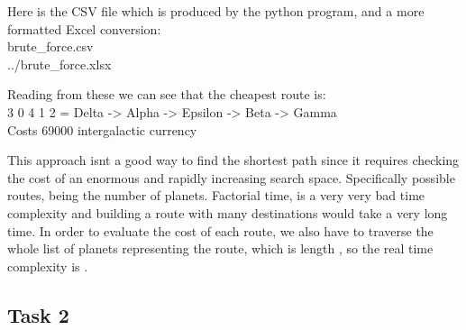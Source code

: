 \documentclass[
]{article}
\begin{document}
Here is the CSV file which is produced by the python program, and a more
formatted Excel conversion:\\
brute\_force.csv\\
../brute\_force.xlsx

Reading from these we can see that the cheapest route is:\\
3 0 4 1 2 = Delta -\textgreater{} Alpha -\textgreater{} Epsilon
-\textgreater{} Beta -\textgreater{} Gamma\\
Costs 69000 intergalactic currency

This approach isn\textquotesingle t a good way to find the shortest path
since it requires checking the cost of an enormous and rapidly
increasing search space. Specifically {} possible routes, {} being the
number of planets. Factorial time, {} is a very very bad time complexity
and building a route with many destinations would take a very long time.
In order to evaluate the cost of each route, we also have to traverse
the whole list of planets representing the route, which is length {}, so
the real time complexity is {}.

\subsection{Task 2}\label{task-2}
\end{document}
